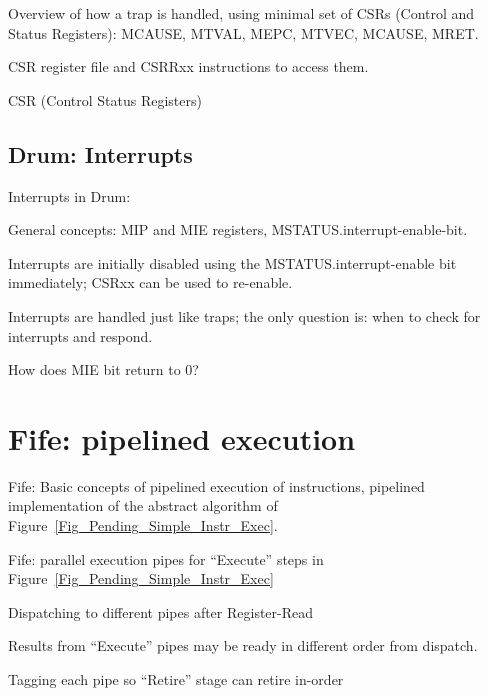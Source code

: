 Overview of how a trap is handled, using minimal set of CSRs (Control
and Status Registers): MCAUSE, MTVAL, MEPC, MTVEC, MCAUSE, MRET.

CSR register file and CSRRxx instructions to access them.

CSR (Control Status Registers)


\subsection{Drum: Interrupts}

Interrupts in Drum:
\begin{tightlist}
  \item General concepts: MIP and MIE registers, MSTATUS.interrupt-enable-bit.

  \item Interrupts are initially disabled using the
        MSTATUS.interrupt-enable bit immediately; CSRxx can be used to
        re-enable.

  \item Interrupts are handled just like traps; the only question is:
        when to check for interrupts and respond.

  \item How does MIE bit return to 0?

\end{tightlist}

\hdivider


\section{Fife: pipelined execution}

Fife: Basic concepts of pipelined execution of instructions, {\ie}
pipelined implementation of the abstract algorithm of
Figure~\ref{Fig_Pending_Simple_Instr_Exec}.

Fife: parallel execution pipes for ``Execute'' steps in
Figure~\ref{Fig_Pending_Simple_Instr_Exec}

\begin{tightlist}

  \item Dispatching to different pipes after Register-Read

  \item Results from ``Execute'' pipes may be ready in different order from dispatch.

  \item   Tagging each pipe so ``Retire'' stage can retire in-order
\end{tightlist}


